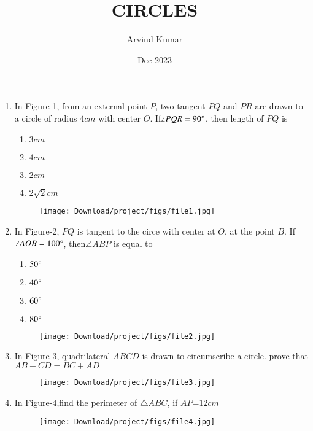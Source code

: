 \documentclass[12pt,-letter paper]{article}
\title{CIRCLES}
\author{Arvind Kumar}
\date{Dec 2023}
\begin{document}
\maketitle
\begin{enumerate}
\item In Figure-1, from an external point $P$, two tangent $PQ$ and $PR$ are drawn to a circle of radius $4cm$ with center $O$. If$\angle{PQR}=90\degree$, then length of $PQ$ is
\begin{enumerate}[label=(\alph*)]
\item $3cm$ 
\item $4cm$
\item $2cm$
\item $2{\sqrt{2}}cm$ 
\end{enumerate}
\begin{figure}[H]
\centering
\texttt{[image: Download/project/figs/file1.jpg]}
\caption{}
\label{fig:Figure1}
 \end{figure}
\item In Figure-2, $PQ$ is tangent to the circe with center at $O$, at the point $B$. If$\angle{AOB}=100\degree$, then$\angle{ABP}$ is equal to\newline
\begin{enumerate}[label=(\alph*)] 
\item $50\degree$ 
\item $40\degree$ 
\item $60\degree$ 
\item $80\degree$
\end{enumerate}
\begin{figure}[H]
\centering
\texttt{[image: Download/project/figs/file2.jpg]}
\caption{}
\label{fig:figure2}
\end{figure}
\item In Figure-3, quadrilateral $ABCD$ is drawn to circumscribe a circle. prove that\newline
$AB+CD=BC+AD$
\begin{figure}[H]
\centering
\texttt{[image: Download/project/figs/file3.jpg]}
\caption{}
\label{fig:Figure3}
\end{figure}
\item In Figure-4,find the perimeter of $\triangle ABC$, if $AP$=$12cm$\newline
\begin{figure}[H]
\centering
\texttt{[image: Download/project/figs/file4.jpg]}
\caption{}                                                                                                         \label{fig:figure4}
\end{figure}
\end{enumerate}
\end{document}

